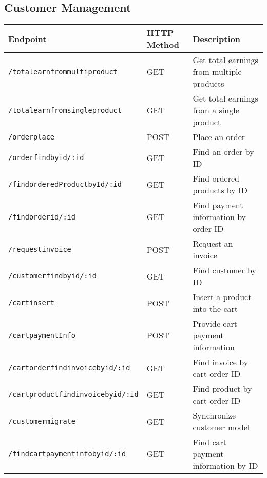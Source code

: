 \subsection*{Customer Management}
\begin{tabular}{|l|l|p{8cm}|}
\hline
\textbf{Endpoint} & \textbf{HTTP Method} & \textbf{Description} \\ \hline
\texttt{/totalearnfrommultiproduct} & GET & Get total earnings from multiple products \\ \hline
\texttt{/totalearnfromsingleproduct} & GET & Get total earnings from a single product \\ \hline
\texttt{/orderplace} & POST & Place an order \\ \hline
\texttt{/orderfindbyid/:id} & GET & Find an order by ID \\ \hline
\texttt{/findorderedProductbyId/:id} & GET & Find ordered products by ID \\ \hline
\texttt{/findorderid/:id} & GET & Find payment information by order ID \\ \hline
\texttt{/requestinvoice} & POST & Request an invoice \\ \hline
\texttt{/customerfindbyid/:id} & GET & Find customer by ID \\ \hline
\texttt{/cartinsert} & POST & Insert a product into the cart \\ \hline
\texttt{/cartpaymentInfo} & POST & Provide cart payment information \\ \hline
\texttt{/cartorderfindinvoicebyid/:id} & GET & Find invoice by cart order ID \\ \hline
\texttt{/cartproductfindinvoicebyid/:id} & GET & Find product by cart order ID \\ \hline
\texttt{/customermigrate} & GET & Synchronize customer model \\ \hline
\texttt{/findcartpaymentinfobyid/:id} & GET & Find cart payment information by ID \\ \hline
\end{tabular}
\vspace{4cm}
